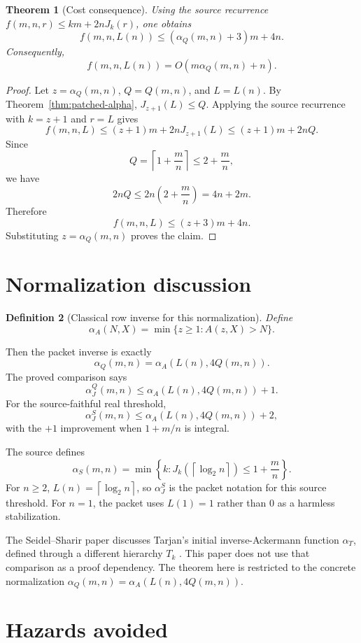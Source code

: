 ﻿\documentclass[11pt]{article}
\newtheorem{theorem}{Theorem}[section]
\newtheorem{definition}[theorem]{Definition}
\newcommand{\ceil}[1]{\left\lceil #1 \right\rceil}
\newcommand{\alphaQ}{\alpha_Q}
\newcommand{\alphaJQ}{\alpha_J^Q}
\newcommand{\alphaJS}{\alpha_J^S}
\begin{document}
\begin{theorem}[Cost consequence]\label{thm:cost}
Using the source recurrence $f(m,n,r)\le km+2nJ_k(r)$, one obtains
\[
f(m,n,L(n))\le(\alphaQ(m,n)+3)m+4n.
\]
Consequently,
\[
f(m,n,L(n))=O(m\alphaQ(m,n)+n).
\]
\end{theorem}

\begin{proof}
Let $z=\alphaQ(m,n)$, $Q=Q(m,n)$, and $L=L(n)$.  By Theorem~\ref{thm:patched-alpha}, $J_{z+1}(L)\le Q$.  Applying the source recurrence with $k=z+1$ and $r=L$ gives
\[
f(m,n,L)\le(z+1)m+2nJ_{z+1}(L)\le(z+1)m+2nQ.
\]
Since
\[
Q=\ceil{1+\frac mn}\le2+\frac mn,
\]
we have
\[
2nQ\le2n\left(2+\frac mn\right)=4n+2m.
\]
Therefore
\[
f(m,n,L)\le(z+3)m+4n.
\]
Substituting $z=\alphaQ(m,n)$ proves the claim.
\end{proof}

\section{Normalization discussion}

\begin{definition}[Classical row inverse for this normalization]
Define
\[
\alpha_A(N,X)=\min\{z\ge1:A(z,X)>N\}.
\]
\end{definition}
Then the packet inverse is exactly
\[
\alphaQ(m,n)=\alpha_A(L(n),4Q(m,n)).
\]
The proved comparison says
\[
\alphaJQ(m,n)\le \alpha_A(L(n),4Q(m,n))+1.
\]
For the source-faithful real threshold,
\[
\alphaJS(m,n)\le \alpha_A(L(n),4Q(m,n))+2,
\]
with the $+1$ improvement when $1+m/n$ is integral.

The source defines
\[
\alpha_S(m,n)=\min\left\{k:J_k(\ceil{\log_2 n})\le1+\frac mn\right\}.
\]
For $n\ge2$, $L(n)=\ceil{\log_2 n}$, so $\alphaJS$ is the packet notation for this source threshold.  For $n=1$, the packet uses $L(1)=1$ rather than $0$ as a harmless stabilization.

The Seidel--Sharir paper discusses Tarjan's initial inverse-Ackermann function $\alpha_T$, defined through a different hierarchy $T_k$ \cite{SeidelSharir2005,Tarjan1975}.  This paper does not use that comparison as a proof dependency.  The theorem here is restricted to the concrete normalization $\alphaQ(m,n)=\alpha_A(L(n),4Q(m,n))$.

\section{Hazards avoided}
\end{document}
